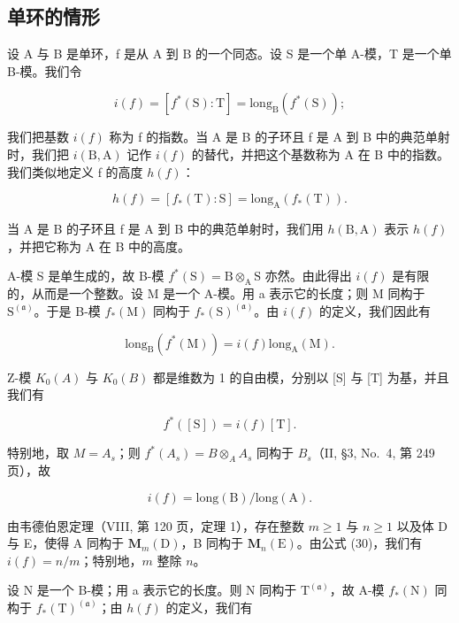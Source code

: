 \subsection{单环的情形}

设 A 与 B 是单环，f 是从 A 到 B 的一个同态。设 S 是一个单 A-模，T 是一个单 B-模。我们令

\[
i (f) = [ f ^ {*} (\mathrm{S}): \mathrm{T} ] = \mathrm{long} _ {\mathrm{B}} (f ^ {*} (\mathrm{S}));\tag{26}
\]

我们把基数 \(i(f)\) 称为 f 的指数。当 A 是 B 的子环且 f 是 A 到 B 中的典范单射时，我们把 \(i(\mathrm{B},\mathrm{A})\) 记作 \(i(f)\) 的替代，并把这个基数称为 A 在 B 中的指数。我们类似地定义 f 的高度 \(h(f)\)：

\[
h (f) = [ f _ {*} (\mathrm{T}): \mathrm{S} ] = \mathrm{long} _ {\mathrm{A}} (f _ {*} (\mathrm{T})).\tag{27}
\]

当 A 是 B 的子环且 f 是 A 到 B 中的典范单射时，我们用 \(h(\mathrm{B}, \mathrm{A})\) 表示 \(h(f)\)，并把它称为 A 在 B 中的高度。

A-模 S 是单生成的，故 B-模 \(f^{*}(\mathrm{S}) = \mathrm{B} \otimes_{\mathrm{A}} \mathrm{S}\) 亦然。由此得出 \(i(f)\) 是有限的，从而是一个整数。设 M 是一个 A-模。用 a 表示它的长度；则 M 同构于 \(\mathrm{S}^{(\mathfrak{a})}\)。于是 B-模 \(f_{*}(\mathrm{M})\) 同构于 \(f_{*}(\mathrm{S})^{(\mathfrak{a})}\)。由 \(i(f)\) 的定义，我们因此有

\[
\mathrm{long} _ {\mathrm{B}} (f ^ {*} (\mathrm{M})) = i (f) \mathrm{long} _ {\mathrm{A}} (\mathrm{M}).\tag{28}
\]

Z-模 \(K_{0}(A)\) 与 \(K_{0}(B)\) 都是维数为 1 的自由模，分别以 {[}S{]} 与 {[}T{]} 为基，并且我们有

\[
f ^ {*} ([ \mathrm{S} ]) = i (f) [ \mathrm{T} ].\tag{29}
\]

特别地，取 \(M = A_{s}\)；则 \(f^{*}(A_{s}) = B \otimes_{A} A_{s}\) 同构于 \(B_{s}\)（II, §3, No.~4, 第 249 页），故

\[
i (f) = \mathrm{long(B)} / \mathrm{long(A)}.\tag{30}
\]

由韦德伯恩定理（VIII, 第 120 页，定理 1），存在整数 \(m \geqslant 1\) 与 \(n \geqslant 1\) 以及体 D 与 E，使得 A 同构于 \(\mathbf{M}_m(\mathrm{D})\)，B 同构于 \(\mathbf{M}_n(\mathrm{E})\)。由公式 (30)，我们有 \(i(f) = n / m\)；特别地，\(m\) 整除 \(n\)。

设 N 是一个 B-模；用 a 表示它的长度。则 N 同构于 \(\mathrm{T}^{(\mathfrak{a})}\)，故 A-模 \(f_{*}(\mathrm{N})\) 同构于 \(f_{*}(\mathrm{T})^{(\mathfrak{a})}\)；由 \(h(f)\) 的定义，我们有

